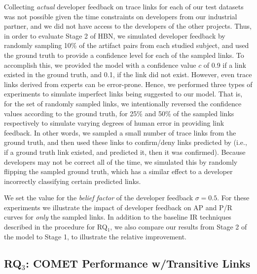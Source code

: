 Collecting \textit{actual} developer feedback on trace links for each of our test datasets was not possible  given the time constraints on developers from our industrial partner, and we did not have access to the developers of the other projects. Thus, in order to evaluate Stage 2 of \Comets HBN, we simulated developer feedback by randomly sampling 10\% of the artifact pairs from each studied subject, and used the ground truth to provide a confidence level for each of the sampled links.  To accomplish this, we provided the model with a confidence value $c$ of 0.9 if a link existed in the ground truth, and 0.1, if the link did not exist. However, even trace links derived from experts can be error-prone. Hence, we performed three types of experiments to simulate imperfect links being suggested to our model. That is, for the set of randomly sampled links, we intentionally reversed the confidence values according to the ground truth, for 25\% and 50\% of the sampled links respectively to simulate varying degrees of human error in providing link feedback. In other words, we sampled a small number of trace links from the ground truth, and then used these links to confirm/deny links predicted by \Comet (i.e., if a ground truth link existed, and \Comet predicted it, then it was confirmed). Because developers may not be correct all of the time, we simulated this by randomly flipping the sampled ground truth, which has a similar effect to a developer incorrectly classifying certain predicted links.

We set the value for the \textit{belief factor} of the developer feedback $\sigma=0.5$. For these experiments we illustrate the impact of developer feedback on AP and P/R curves for \textit{only} the sampled links. In addition to the baseline IR techniques described in the procedure for RQ$_1$, we also compare our results from Stage 2 of the model to Stage 1, to illustrate the relative improvement.


\subsection{RQ$_3$: C{\footnotesize OMET} Performance w/Transitive Links}
\label{sub:study-rq3}

